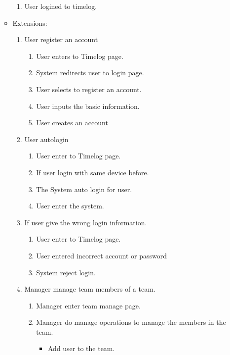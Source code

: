 \documentclass[12pt, a4paper]{article}
\begin{document}
\begin{CJK*}{UTF8}{bkai}
\begin{enumerate}
\begin{itemize}
\begin{enumerate}
              \item User logined to timelog.
            \end{enumerate}
          \item Extensions:
            \begin{enumerate}
              \item User register an account
              \begin{enumerate}
                \item User enters to Timelog page.
                \item System redirects user to login page.
                \item User selects to register an account.
                \item User inputs the basic information.
                \item User creates an account
              \end{enumerate}
              \item User autologin
                \begin{enumerate}
                  \item User enter to Timelog page.
                  \item If user login with same device before.
                  \item The System auto login for user.
                  \item User enter the system.
                \end{enumerate}
              \item If user give the wrong login information.
                \begin{enumerate}
                  \item User enter to Timelog page.
                  \item User entered incorrect account or password
                  \item System reject login.
                \end{enumerate}
              \item Manager manage team members of a team.
                \begin{enumerate}
                  \item Manager enter team manage page.
                  \item Manager do manage operations to manage the members in the team.
                    \begin{itemize}
                      \item Add user to the team.

\end{itemize}
\end{enumerate}
\end{enumerate}
\end{itemize}
\end{enumerate}
\end{CJK*}
\end{document}
